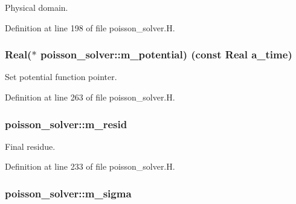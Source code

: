 Physical domain. 



Definition at line 198 of file poisson\+\_\+solver.\+H.

\subsubsection[{\texorpdfstring{m\+\_\+potential}{m_potential}}]{\setlength{\rightskip}{0pt plus 5cm}Real($\ast$ poisson\+\_\+solver\+::m\+\_\+potential) (const Real a\+\_\+time)\hspace{0.3cm}{\ttfamily [protected]}}\hypertarget{classpoisson__solver_a9974b3536eabcf42d5182b5d5e6e7aee}{}\label{classpoisson__solver_a9974b3536eabcf42d5182b5d5e6e7aee}


Set potential function pointer. 



Definition at line 263 of file poisson\+\_\+solver.\+H.

\subsubsection[{\texorpdfstring{m\+\_\+resid}{m_resid}}]{ poisson\+\_\+solver\+::m\+\_\+resid\hspace{0.3cm}{\ttfamily [protected]}}\hypertarget{classpoisson__solver_a16ee594459be04b5adf33b53102362ee}{}\label{classpoisson__solver_a16ee594459be04b5adf33b53102362ee}


Final residue. 



Definition at line 233 of file poisson\+\_\+solver.\+H.

\subsubsection[{\texorpdfstring{m\+\_\+sigma}{m_sigma}}]{ poisson\+\_\+solver\+::m\+\_\+sigma\hspace{0.3cm}{\ttfamily [protected]}}\hypertarget{classpoisson__solver_ab9746460a6725b0e9ef913f32214239b}{}\label{classpoisson__solver_ab9746460a6725b0e9ef913f32214239b}


